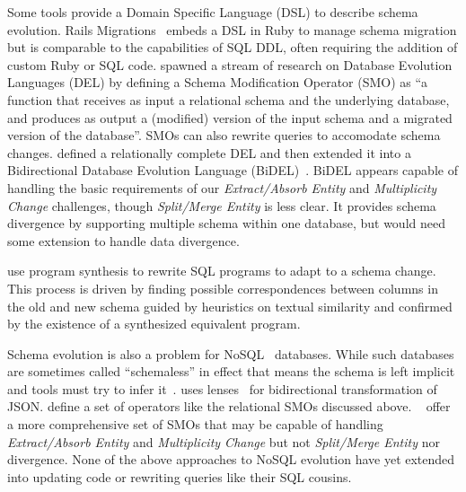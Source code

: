 \documentclass[english,submission]{programming}
\begin{document}
Some tools provide a Domain Specific Language (DSL) to describe schema evolution. Rails Migrations~\cite{RailsMigrations} embeds a DSL in Ruby to manage schema migration but is comparable to the capabilities of SQL DDL, often requiring the addition of custom Ruby or SQL code. \citet{curino08} spawned a stream of research on Database Evolution Languages (DEL) by defining a Schema Modification Operator (SMO) as ``a function that receives as input a relational schema and the underlying database, and produces as output a (modified) version of the input schema and a migrated version of the database''. SMOs can also rewrite queries to accomodate schema changes. \citet{herrmann15} defined a relationally complete DEL and then extended it into a Bidirectional Database Evolution Language (BiDEL)~\cite{herrmann17}. BiDEL appears capable of handling the basic requirements of our \emph{Extract/Absorb Entity} and \emph{Multiplicity Change} challenges, though \emph{Split/Merge Entity} is less clear. It provides schema divergence by supporting multiple schema within one database, but would need some extension to handle data divergence.

\citet{wang19} use program synthesis to rewrite SQL programs to adapt to a schema change. This process is driven by finding possible correspondences between columns in the old and new schema guided by heuristics on textual similarity and confirmed by the existence of a synthesized equivalent program.

Schema evolution is also a problem for NoSQL~\cite{sadalage12} databases. While such databases are sometimes called ``schemaless'' in effect that means the schema is left implicit and tools must try to infer it~\cite{storl20, storl22}. \citet{Cambria} uses lenses~\cite{Foster2007} for bidirectional transformation of JSON. \citet{scherzinger13} define a set of operators like the relational SMOs discussed above. \citeauthor*{chillon21}~\cite{chillon21, chillon22} offer a more comprehensive set of SMOs that may be capable of handling \textit{Extract/Absorb Entity} and \emph{Multiplicity Change} but not \emph{Split/Merge Entity} nor divergence. None of the above approaches to NoSQL evolution have yet extended into updating code or rewriting queries like their SQL cousins.
\end{document}
